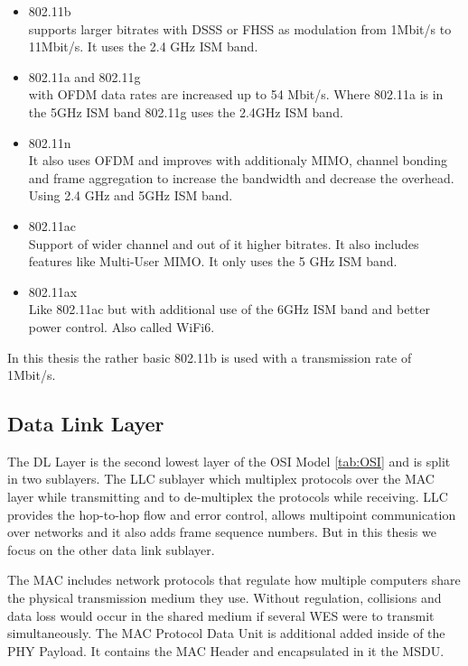 \begin{itemize}
	\item 802.11b \\
	supports larger bitrates with \ac{DSSS} or \ac{FHSS} as modulation from 1Mbit/s to 11Mbit/s.
	It uses the 2.4 GHz ISM band.
	\item 802.11a and 802.11g \\
	with \ac{OFDM} data rates are increased up to 54 Mbit/s.
	Where 802.11a is in the 5GHz ISM band 802.11g uses the 2.4GHz ISM band.
	\item 802.11n\\
	It also uses \ac{OFDM} and improves with additionaly \ac{MIMO}, channel bonding and frame aggregation to increase the bandwidth and decrease the overhead.
	Using 2.4 GHz and 5GHz ISM band.
	\item 802.11ac\\
	Support of wider channel and out of it higher bitrates. It also includes features like Multi-User MIMO.
	It only uses the 5 GHz ISM band.
	\item 802.11ax\\
	Like 802.11ac but with additional use of the 6GHz ISM band and better power control. 
	Also called WiFi6.
\end{itemize}

In this thesis the rather basic 802.11b is used with a transmission rate of 1Mbit/s.

\subsection{Data Link Layer}

The \ac{DL} Layer is the second lowest layer of the \ac{OSI} Model \ref{tab:OSI} and is split in two sublayers. 
The \ac{LLC} sublayer which multiplex protocols over the MAC layer while transmitting and to de-multiplex the protocols while receiving.
LLC provides the hop-to-hop flow and error control, allows multipoint communication over networks 
and it also adds frame sequence numbers.
But in this thesis we focus on the other data link sublayer.

The \ac{MAC} includes network protocols that regulate how multiple computers share the physical transmission medium they use. 
Without regulation, collisions and data loss would occur in the shared medium if several WES were to transmit simultaneously.
The \ac{MAC} Protocol Data Unit is additional added inside of the \ac{PHY} Payload. 
It contains the \ac{MAC} Header and encapsulated in it the \ac{MSDU}.


